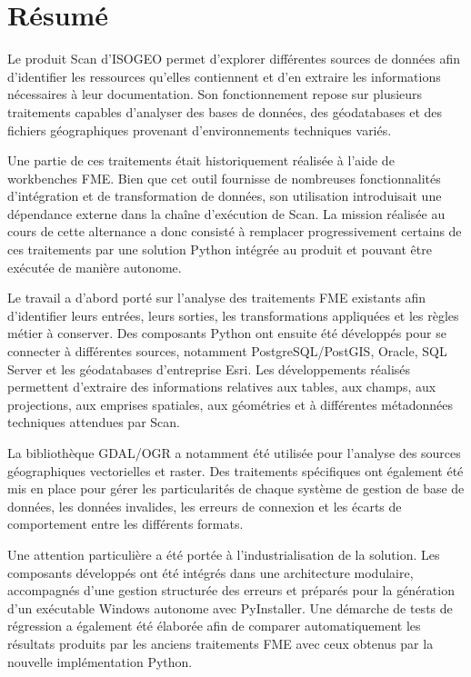 
\chapter*{Résumé}

Le produit Scan d'ISOGEO permet d'explorer différentes sources de données afin
d'identifier les ressources qu'elles contiennent et d'en extraire les
informations nécessaires à leur documentation.
Son fonctionnement repose sur
plusieurs traitements capables d'analyser des bases de données, des
géodatabases et des fichiers géographiques provenant d'environnements
techniques variés.

Une partie de ces traitements était historiquement réalisée à l'aide de
workbenches FME. Bien que cet outil fournisse de nombreuses fonctionnalités
d'intégration et de transformation de données, son utilisation introduisait une
dépendance externe dans la chaîne d'exécution de Scan.
La mission réalisée au
cours de cette alternance a donc consisté à remplacer progressivement certains
de ces traitements par une solution Python intégrée au produit et pouvant être
exécutée de manière autonome.

Le travail a d'abord porté sur l'analyse des traitements FME existants afin
d'identifier leurs entrées, leurs sorties, les transformations appliquées et les
règles métier à conserver.
Des composants Python ont ensuite été développés
pour se connecter à différentes sources, notamment PostgreSQL/PostGIS, Oracle,
SQL Server et les géodatabases d'entreprise Esri.
Les développements réalisés
permettent d'extraire des informations relatives aux tables, aux champs, aux
projections, aux emprises spatiales, aux géométries et à différentes
métadonnées techniques attendues par Scan.

La bibliothèque GDAL/OGR a notamment été utilisée pour l'analyse des sources
géographiques vectorielles et raster.
Des traitements spécifiques ont également
été mis en place pour gérer les particularités de chaque système de gestion de
base de données, les données invalides, les erreurs de connexion et les écarts
de comportement entre les différents formats.

Une attention particulière a été portée à l'industrialisation de la solution.
Les composants développés ont été intégrés dans une architecture modulaire,
accompagnés d'une gestion structurée des erreurs et préparés pour la génération
d'un exécutable Windows autonome avec PyInstaller.
Une démarche de tests de
régression a également été élaborée afin de comparer automatiquement les
résultats produits par les anciens traitements FME avec ceux obtenus par la
nouvelle implémentation Python.


